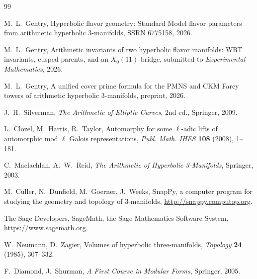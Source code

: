 \documentclass[11pt,a4paper]{article}
\theoremstyle{definition}
\begin{document}
\begin{thebibliography}{99}

  M.~L.~Gentry,
  Hyperbolic flavor geometry: Standard Model flavor parameters
  from arithmetic hyperbolic 3-manifolds,
  SSRN 6775158, 2026.

  M.~L.~Gentry,
  Arithmetic invariants of two hyperbolic flavor manifolds:
  WRT invariants, cusped parents, and an $X_0(11)$ bridge,
  submitted to \emph{Experimental Mathematics}, 2026.

  M.~L.~Gentry,
  A unified cover prime formula for the PMNS and CKM
  Farey towers of arithmetic hyperbolic 3-manifolds,
  preprint, 2026.

  J.~H.~Silverman,
  \emph{The Arithmetic of Elliptic Curves}, 2nd ed.,
  Springer, 2009.

  L.~Clozel, M.~Harris, R.~Taylor,
  Automorphy for some $\ell$-adic lifts of automorphic mod
  $\ell$ Galois representations,
  \emph{Publ. Math. IHES} \textbf{108} (2008), 1--181.

  C.~Maclachlan, A.~W.~Reid,
  \emph{The Arithmetic of Hyperbolic 3-Manifolds},
  Springer, 2003.

  M.~Culler, N.~Dunfield, M.~Goerner, J.~Weeks,
  SnapPy, a computer program for studying the geometry and
  topology of 3-manifolds,
  \url{http://snappy.computop.org}.

  The Sage Developers,
  SageMath, the Sage Mathematics Software System,
  \url{https://www.sagemath.org}.

  W.~Neumann, D.~Zagier,
  Volumes of hyperbolic three-manifolds,
  \emph{Topology} \textbf{24} (1985), 307--332.

  F.~Diamond, J.~Shurman,
  \emph{A First Course in Modular Forms},
  Springer, 2005.

\end{thebibliography}
\end{document}
